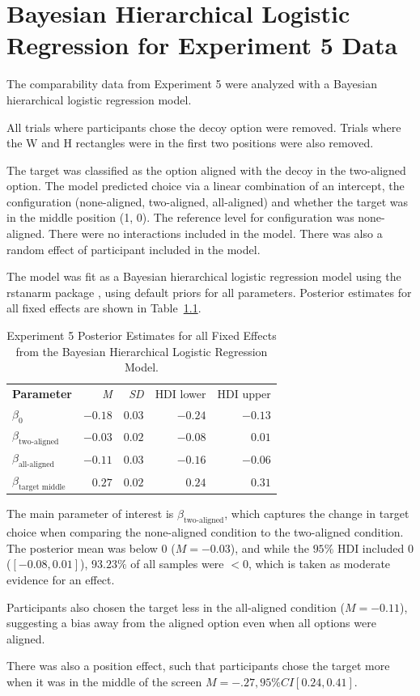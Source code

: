\chapter{Bayesian Hierarchical Logistic Regression for Experiment 5 Data}

The comparability data from Experiment 5 were analyzed with a Bayesian hierarchical logistic regression model.

All trials where participants chose the decoy option were removed. Trials where the W and H rectangles were in the first two positions were also removed. 

The target was classified as the option aligned with the decoy in the two-aligned option. The model predicted choice via a linear combination of an intercept, the configuration (none-aligned, two-aligned, all-aligned) and whether the target was in the middle position (1, 0). The reference level for configuration was none-aligned. There were no interactions included in the model. There was also a random effect of participant included in the model. 

The model was fit as a Bayesian hierarchical logistic regression model using the rstanarm package \parencite{rstanarm}, using default priors for all parameters. Posterior estimates for all fixed effects are shown in Table~\ref{tab:e5_logit_params}.

\begin{table}[ht]
    \centering
    \begin{tabular}{lrrrr}
        \toprule
        \textbf{Parameter} & \textit{M} & \textit{SD} & HDI lower & HDI upper \\
        $\beta_{0}$        & $-0.18$    &  $0.03$     & $-0.24$   & $-0.13$   \\
        $\beta_{\text{two-aligned}}$ & $-0.03$ & $0.02$ & $-0.08$ & $0.01$    \\
        $\beta_{\text{all-aligned}}$ & $-0.11$ & $0.03$ & $-0.16$ & $-0.06$   \\
        $\beta_{\text{target middle}}$ & $0.27$ & $0.02$ & $0.24$ & $0.31$    \\
        \bottomrule
    \end{tabular}
    \caption{Experiment 5 Posterior Estimates for all Fixed Effects from the Bayesian Hierarchical Logistic Regression Model.}
    \label{tab:e5_logit_params}
\end{table}

The main parameter of interest is $\beta_{\text{two-aligned}}$, which captures the change in target choice when comparing the none-aligned condition to the two-aligned condition. The posterior mean was below $0$ ($\textit{M}=-0.03$), and while the $95\%$ HDI included 0 ($[-0.08, 0.01]$), $93.23\%$ of all samples were $<0$, which is taken as moderate evidence for an effect. 

Participants also chosen the target less in the all-aligned condition ($\textit{M}=-0.11$), suggesting a bias away from the aligned option even when all options were aligned. 

There was also a position effect, such that participants chose the target more when it was in the middle of the screen $\textit{M}=-.27, 95\%CI[0.24,0.41]$. 